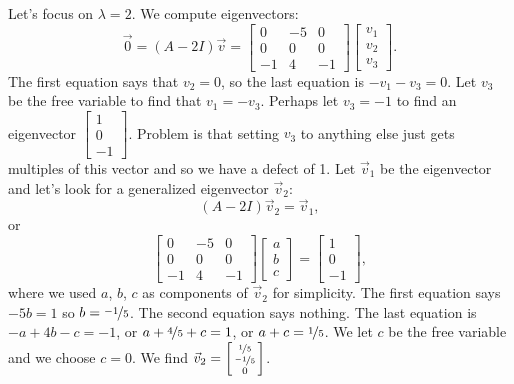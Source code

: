 \begin{exampleSol}
Let's focus on $\lambda = 2$.  We compute eigenvectors:
\begin{equation*}
\vec{0} =
(A - 2 I) \vec{v}
=
\begin{bmatrix}
0 & -5 & 0 \\
0 & 0 & 0 \\
-1 & 4 & -1
\end{bmatrix}
\begin{bmatrix}
v_1 \\ v_2 \\ v_3
\end{bmatrix}
.
\end{equation*}
The first equation says that $v_2 = 0$, so the last equation
is $-v_1 -v_3 = 0$.  Let $v_3$ be the free variable to find
that $v_1 = -v_3$.  Perhaps let $v_3 = -1$ to find an eigenvector
$\left[ \begin{smallmatrix} 1 \\ 0 \\ -1 \end{smallmatrix} \right]$.
Problem is that setting $v_3$ to anything else just gets multiples
of this vector and so we have a defect of 1.
Let $\vec{v}_1$ be the eigenvector and let's look for
a generalized eigenvector $\vec{v}_2$:
\begin{equation*}
(A - 2 I) \vec{v}_2 = \vec{v}_1 , 
\end{equation*}
or
\begin{equation*}
\begin{bmatrix}
0 & -5 & 0 \\
0 & 0 & 0 \\
-1 & 4 & -1
\end{bmatrix}
\begin{bmatrix}
a \\ b \\ c
\end{bmatrix}
=
\begin{bmatrix}
1 \\ 0 \\ -1
\end{bmatrix} ,
\end{equation*}
where we used $a$, $b$, $c$ as components of $\vec{v}_2$ for simplicity.
The first equation says $-5b = 1$ so $b = \nicefrac{-1}{5}$.  The
second equation says nothing.
The last equation is $-a + 4b - c = -1$, or
$a + \nicefrac{4}{5} + c = 1$, or
$a + c = \nicefrac{1}{5}$.  We let $c$ be the free variable and we
choose $c=0$.  We find
$\vec{v}_2 = \left[ \begin{smallmatrix} \nicefrac{1}{5} \\ \nicefrac{-1}{5}
\\ 0 \end{smallmatrix} \right]$.


\end{exampleSol}
